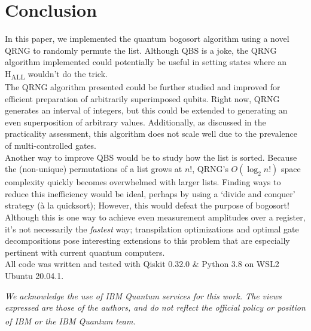 \documentclass[12pt]{article}
\begin{document}
\pagebreak

\section{Conclusion}
In this paper, we implemented the quantum bogosort algorithm using a novel QRNG to randomly permute the list. Although QBS is a joke, the QRNG algorithm implemented could potentially be useful in setting states where an H\textsubscript{ALL} wouldn't do the trick. \\
The QRNG algorithm presented could be further studied and improved for efficient preparation of arbitrarily superimposed qubits. Right now, QRNG generates an interval of integers, but this could be extended to generating an even superposition of arbitrary values. Additionally, as discussed in the practicality assessment, this algorithm does not scale well due to the prevalence of multi-controlled gates. \\
Another way to improve QBS would be to study how the list is sorted. Because the (non-unique) permutations of a list grows at $n!$, QRNG's $O(\log_2 n!)$ space complexity quickly becomes overwhelmed with larger lists. Finding ways to reduce this inefficiency would be ideal, perhaps by using a `divide and conquer' strategy (\`{a} la quicksort); However, this would defeat the purpose of bogosort! \\
Although this is one way to achieve even measurement amplitudes over a register, it's not necessarily the \textit{fastest} way; transpilation optimizations and optimal gate decompositions pose interesting extensions to this problem that are especially pertinent with current quantum computers.  \\

\vspace{10mm}
\noindent All code was written and tested with Qiskit 0.32.0 \& Python 3.8 on WSL2 Ubuntu 20.04.1.

\vspace{15mm}
\noindent \emph{We acknowledge the use of IBM Quantum services for this work. The views expressed are those of the authors, and do not reflect the official policy or position of IBM or the IBM Quantum team.\textsuperscript{\cite{ibm_21}}}

\pagebreak


\nocite{*}

\end{document}
